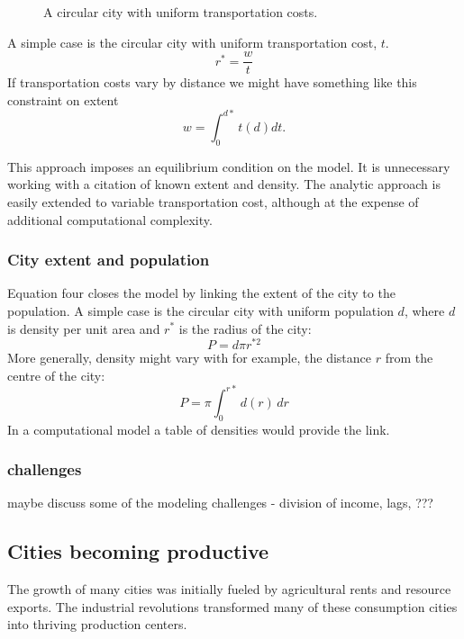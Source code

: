 \begin{figure}
    \begin{center}
    
    \caption{A circular city with uniform transportation costs.}
    \label{fig-rent-alonzo}
    \end{center}
\end{figure}

A simple case is the circular city with uniform transportation cost, $t$. \[r^*= \frac{w}{t}\]%
If transportation costs vary by  distance we might have something like this constraint on extent\[w=\int_0^{d*} t(d)dt.\]

This approach imposes an equilibrium condition on the model. It is unnecessary working with a citation of known extent and density. The analytic approach is easily extended to variable transportation cost, although at the expense of additional computational complexity.

\subsubsection{City extent and population}
Equation  four  closes the model by linking the extent of the city to the population. A simple case is the circular city with uniform population $d$, where $d$ is density per unit area and $r^*$ is the radius of the city: \[P=d\pi r^{*2}\] 
More generally, density might vary with for example, the distance $r$ from the centre of the city:
\[P=\pi \int_{0}^{r*}d(r)\,dr\] 
In a computational model a table of densities would provide the link.



\subsubsection{challenges}
maybe discuss some of the modeling challenges - division of income, lags, ???

\vspace{2cm}


\subsection{Cities becoming productive}
 The growth of many cities was initially fueled by agricultural rents and resource exports. The industrial revolutions transformed many of these consumption cities into thriving production centers. 

